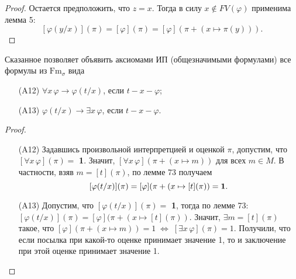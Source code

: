 \documentclass[a4paper, fleqn]{article}
\begin{document}
\begin{proof}
    Остается предположить, что $z = x$. Тогда в силу $x \not\in FV(\varphi)$ применима лемма 5:
    \[ [\varphi(y/x)](\pi) = [\varphi](\pi) = [\varphi](\pi + (x \mapsto \pi(y))). \]
     
    \end{proof}
    
    Сказанное позволяет объявить аксиомами ИП (общезначимыми формулами) все формулы из $\text{Fm}_{\sigma}$ вида\\[-25 pt]
    \begin{enumerate}
    \item[(A12)] $\forall x\, \varphi \to \varphi(t/x)$, если $t-x-\varphi$;
    \item[(A13)] $\varphi(t/x) \to \exists x\, \varphi$, если $t-x-\varphi$.
    \end{enumerate}
    \begin{proof}
        \begin{enumerate}
        \item[(A12)] Задавшись произвольной интерпретцией и оценкой $\pi$, допустим, что $[\forall x\, \varphi](\pi) =$\textbf{ 1}. Значит, $[\forall x\, \varphi](\pi + (x \mapsto m))$ для всех $m \in M$. В частности, взяв $m = [t](\pi)$, по лемме 73 получаем
        \[ [\varphi(t/x)](\pi) = [\varphi](\pi + (x \mapsto [t](\pi)) = \text{\bf 1}. \]
        \item[(A13)] Допустим, что $[\varphi(t/x)](\pi) =$ \textbf{ 1}, тогда по лемме 73: $[\varphi(t/x)](\pi) = [\varphi](\pi + (x \mapsto [t](\pi))$. Значит, $\exists m = [t](\pi)$ такое, что $[\varphi](\pi + (x \mapsto m)) = 1 \; \Leftrightarrow \; [\exists x\, \varphi](\pi) = 1$. Получили, что если посылка при какой-то оценке принимает значение 1, то и заключение при этой оценке принимает значение 1.
        \end{enumerate}
    \end{proof}
\end{document}
